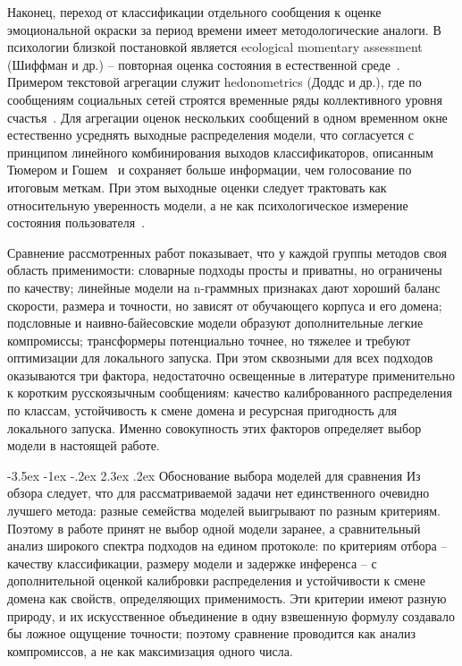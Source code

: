 \documentclass[12pt,a4paper]{report}
\makeatletter
\renewcommand{\section}{\@startsection{section}{1}{\z@}%
  {-3.5ex \@plus -1ex \@minus -.2ex}%
  {2.3ex \@plus .2ex}%
  {\normalfont\large\bfseries\centering}}
\makeatother
\begin{document}
Наконец, переход от классификации отдельного сообщения к оценке эмоциональной окраски за период времени имеет методологические аналоги. В психологии близкой постановкой является ecological momentary assessment (Шиффман и др.) -- повторная оценка состояния в естественной среде~\cite{shiffman2008ema}. Примером текстовой агрегации служит hedonometrics (Доддс и др.), где по сообщениям социальных сетей строятся временные ряды коллективного уровня счастья~\cite{dodds2011hedonometrics}. Для агрегации оценок нескольких сообщений в одном временном окне естественно усреднять выходные распределения модели, что согласуется с принципом линейного комбинирования выходов классификаторов, описанным Тюмером и Гошем~\cite{tumer1999combiners} и сохраняет больше информации, чем голосование по итоговым меткам. При этом выходные оценки следует трактовать как относительную уверенность модели, а не как психологическое измерение состояния пользователя~\cite{guo2017calibration}.

Сравнение рассмотренных работ показывает, что у каждой группы методов своя область применимости: словарные подходы просты и приватны, но ограничены по качеству; линейные модели на n-граммных признаках дают хороший баланс скорости, размера и точности, но зависят от обучающего корпуса и его домена; подсловные и наивно-байесовские модели образуют дополнительные легкие компромиссы; трансформеры потенциально точнее, но тяжелее и требуют оптимизации для локального запуска. При этом сквозными для всех подходов оказываются три фактора, недостаточно освещенные в литературе применительно к коротким русскоязычным сообщениям: качество калиброванного распределения по классам, устойчивость к смене домена и ресурсная пригодность для локального запуска. Именно совокупность этих факторов определяет выбор модели в настоящей работе.

\section{Обоснование выбора моделей для сравнения}
Из обзора следует, что для рассматриваемой задачи нет единственного очевидно лучшего метода: разные семейства моделей выигрывают по разным критериям. Поэтому в работе принят не выбор одной модели заранее, а сравнительный анализ широкого спектра подходов на едином протоколе: по критериям отбора -- качеству классификации, размеру модели и задержке инференса -- с дополнительной оценкой калибровки распределения и устойчивости к смене домена как свойств, определяющих применимость. Эти критерии имеют разную природу, и их искусственное объединение в одну взвешенную формулу создавало бы ложное ощущение точности; поэтому сравнение проводится как анализ компромиссов, а не как максимизация одного числа.
\end{document}
